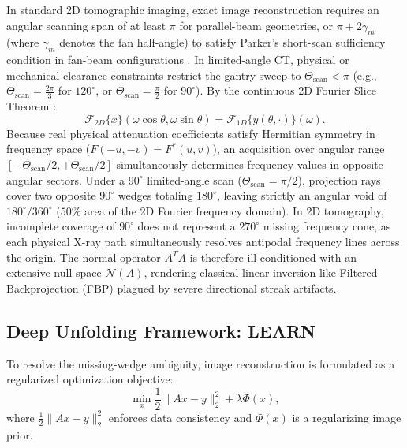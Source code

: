 \documentclass[runningheads]{llncs}
\begin{document}
In standard 2D tomographic imaging, exact image reconstruction requires an angular scanning span of at least $\pi$ for parallel-beam geometries, or $\pi + 2\gamma_m$ (where $\gamma_m$ denotes the fan half-angle) to satisfy Parker's short-scan sufficiency condition in fan-beam configurations \cite{kak2001principles}. In limited-angle CT, physical or mechanical clearance constraints restrict the gantry sweep to $\Theta_{\text{scan}} < \pi$ (e.g., $\Theta_{\text{scan}} = \frac{2\pi}{3}$ for $120^\circ$, or $\Theta_{\text{scan}} = \frac{\pi}{2}$ for $90^\circ$). By the continuous 2D Fourier Slice Theorem \cite{kak2001principles}:
\begin{equation}
\mathcal{F}_{2D}\{x\}(\omega \cos\theta, \omega \sin\theta) = \mathcal{F}_{1D}\{y(\theta, \cdot)\}(\omega).
\end{equation}
Because real physical attenuation coefficients satisfy Hermitian symmetry in frequency space ($F(-u, -v) = F^*(u, v)$), an acquisition over angular range $[-\Theta_{\text{scan}}/2, +\Theta_{\text{scan}}/2]$ simultaneously determines frequency values in opposite angular sectors. Under a $90^\circ$ limited-angle scan ($\Theta_{\text{scan}} = \pi/2$), projection rays cover two opposite $90^\circ$ wedges totaling $180^\circ$, leaving strictly an angular void of $180^\circ / 360^\circ$ ($50\%$ area of the 2D Fourier frequency domain). In 2D tomography, incomplete coverage of $90^\circ$ does not represent a $270^\circ$ missing frequency cone, as each physical X-ray path simultaneously resolves antipodal frequency lines across the origin. The normal operator $A^T A$ is therefore ill-conditioned with an extensive null space $\mathcal{N}(A)$, rendering classical linear inversion like Filtered Backprojection (FBP) plagued by severe directional streak artifacts.

\subsection{Deep Unfolding Framework: LEARN}
To resolve the missing-wedge ambiguity, image reconstruction is formulated as a regularized optimization objective:
\begin{equation}
\min_{x} \frac{1}{2} \| A x - y \|_2^2 + \lambda \Phi(x),
\label{eq:opt_problem}
\end{equation}
where $\frac{1}{2} \| A x - y \|_2^2$ enforces data consistency and $\Phi(x)$ is a regularizing image prior.
\end{document}
